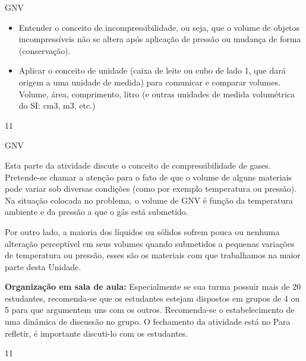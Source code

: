 \def\currentcolor{session2}
\begin{objectives}{GNV}
{
\begin{itemize}
\item {} 
Entender o conceito de incompressibilidade, ou seja, que o volume de objetos incompressíveis não se altera após aplicação de pressão ou mudança de forma (conservação).

\item {} 
Aplicar o conceito de unidade (caixa de leite ou cubo de lado 1, que dará origem a uma unidade de medida) para comunicar e comparar volumes. Volume, área, comprimento, litro (e outras unidades de medida volumétrica do SI: cm3, m3, etc.)

\end{itemize}
}{1}{1}
\end{objectives}
\begin{sugestions}{GNV}
{
Esta parte da atividade discute o conceito de compressibilidade de gases. Pretende-se chamar a atenção para o fato de que o volume de alguns materiais pode variar sob diversas condições (como por exemplo temperatura ou pressão). Na situação colocada no problema, o volume de GNV é função da temperatura ambiente e da pressão a que o gás está submetido.

Por outro lado, a maioria dos líquidos ou sólidos sofrem pouca ou nenhuma alteração perceptível em seus volumes quando submetidos a pequenas variações de temperatura ou pressão, esses são os materiais com que trabalhamos na maior parte desta Unidade.

\textbf{Organização em sala de aula:}
Especialmente se sua turma possuir mais de 20 estudantes, recomenda-se que os estudantes estejam dispostos em grupos de 4 ou 5 para que argumentem uns com os outros. Recomenda-se o estabelecimento de uma dinâmica de discussão no grupo. O fechamento da atividade está no Para refletir, é importante discuti-lo com os estudantes.
}{1}{1}
\end{sugestions}
